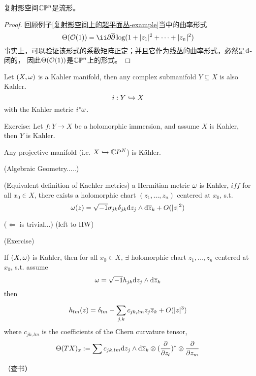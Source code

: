 \begin{example}
复射影空间$\mathbb{C}\mathbb{P}^n$是\Kahler 流形。
\end{example}

\begin{proof}
回顾例子\ref{复射影空间上的超平面丛-example}当中的曲率形式
$$\Theta(\mcalO(1))=\ii\p\pbar\log(1+|z_1|^2+\cdots+|z_n|^2)$$
事实上，可以验证该形式的系数矩阵正定；并且它作为线丛的曲率形式，必然是$\mathrm{d}$-闭的，
因此$\Theta(\mathcal{O}(1))$是$\mathbb{C}\mathbb{P}^n$上的\Kahler 形式。
\end{proof}


\begin{example}
Let $(X,\omega)$ is a Kahler manifold,
then  any complex submanifold $Y\subseteq X$ is also Kahler.
$$i:Y\hookrightarrow X$$
with the Kahler metric $i^*\omega$.
\end{example}
Exercise: Let $f:Y\to X$ be a holomorphic immersion, and assume $X$ is Kahler,
then $Y$ is Kahler.
\begin{cor}
Any projective manifold (i.e. $X\hookrightarrow \mathbb{C} P^N$) is K\"{a}hler.
\end{cor}
(Algebraic Geometry.....)

\begin{prop}(Equivalent definition of Kaehler metrics)
a Hermitian metric $\omega$ is Kahler, $iff$
for all $x_0\in X$, there exists a holomorphic chart $(z_1,...,z_n)$
centered at $x_0$, s.t.
$$\omega(z)=\sqrt{-1}\sigma_{jk}\delta_{jk}\mathrm{d} z_j\wedge\mathrm{d}\overline{z}_k
+O(|z|^2)
$$
\end{prop}

($\Leftarrow$ is trivial...)
(left to HW)

\begin{thm}(Exercise)

If $(X,\omega)$ is Kahler, then for all $x_0\in X$,
$\exists$ holomorphic chart $z_1,...,z_n$ centered at $x_0$, s.t.
assume
$$\omega=\sqrt{-1}h_{jk}\mathrm{d} z_j\wedge\mathrm{d}\overline{z}_k$$
then

$$h_{lm}(z)=\delta_{lm}-\sum_{j,k}c_{jk,lm}z_j\overline{z}_k+O(|z|^3)$$
where $c_{jk,lm}$ is the coefficients of the Chern curvature tensor,
$$\Theta(TX)_{x}:=\sum c_{jk,lm}\mathrm{d} z_j\wedge\mathrm{d}\overline{z}_k\otimes(\frac{\partial } {\partial z_l})^*\otimes
\frac{\partial } {\partial z_m}$$
\end{thm}
（查书）




